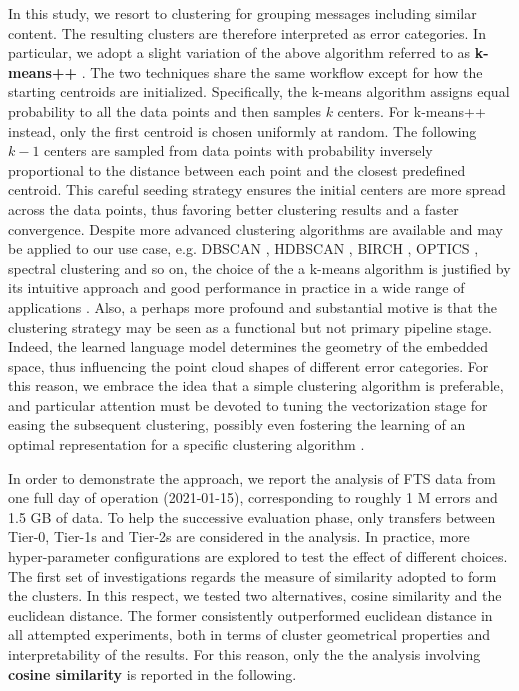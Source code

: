 In this study, we resort to clustering for grouping messages including similar content.
The resulting clusters are therefore interpreted as error categories.
In particular, we adopt a slight variation of the above algorithm referred to as \mbox{\textbf{k-means++}} \cite{arthur2006kmeans++}.
The two techniques share the same workflow except for how the starting centroids are initialized.  
Specifically, the \mbox{k-means} algorithm assigns equal probability to all the data points and then samples $k$ centers.
For \mbox{k-means++} instead, only the first centroid is chosen uniformly at random. The following $k-1$ centers are sampled from data points with probability inversely proportional to the distance between each point and the closest predefined centroid.
This careful seeding strategy ensures the initial centers are more spread across the data points, thus favoring better clustering results and a faster convergence.
Despite more advanced clustering algorithms are available and may be applied to our use case, e.g. DBSCAN \cite{ester1996dbscan}, HDBSCAN \cite{mcinnes2017hdbscan}, BIRCH \cite{zhang1996birch}, OPTICS \cite{ankerst1999optics}, spectral clustering \cite{ng2002spectral} and so on, the choice of the a \mbox{k-means} algorithm is justified by its intuitive approach and good performance in practice in a wide range of applications \cite{von2012clustering}.
Also, a perhaps more profound and substantial motive is that the clustering strategy may be seen as a functional but not primary pipeline stage. Indeed, the learned language model determines the geometry of the embedded space, thus influencing the point cloud shapes of different error categories. 
For this reason, we embrace the idea that a simple clustering algorithm is preferable, and particular attention must be devoted to tuning the vectorization stage for easing the subsequent clustering, possibly even fostering the learning of an optimal representation for a specific clustering algorithm \cite{yang2017kmeans-friendly}.

In order to demonstrate the approach, we report the analysis of FTS data from one full day of operation (2021-01-15), corresponding to roughly 1 M errors and 1.5 GB of data.
To help the successive evaluation phase, only transfers between Tier-0, Tier-1s and Tier-2s are considered in the analysis.
In practice, more hyper-parameter configurations are explored to test the effect of different choices.
The first set of investigations regards the measure of similarity adopted to form the clusters. 
In this respect, we tested two alternatives, cosine similarity and the euclidean distance.
The former consistently outperformed euclidean distance in all attempted experiments, 
both in terms of cluster geometrical properties and interpretability of the results.
For this reason, only the the analysis involving \textbf{cosine similarity} is reported in the following.

